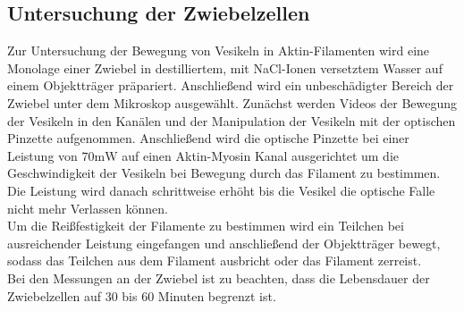 \subsection{Untersuchung der Zwiebelzellen}
Zur Untersuchung der Bewegung von Vesikeln in Aktin-Filamenten wird eine Monolage einer Zwiebel in destilliertem, mit NaCl-Ionen versetztem Wasser auf einem Objektträger präpariert. Anschließend wird ein unbeschädigter Bereich der Zwiebel unter dem Mikroskop ausgewählt. Zunächst werden Videos der Bewegung der Vesikeln in den Kanälen und der Manipulation der Vesikeln mit der optischen Pinzette aufgenommen. Anschließend wird die optische Pinzette bei einer Leistung von $70 \si{\milli\watt}$ auf einen Aktin-Myosin Kanal ausgerichtet um die Geschwindigkeit der Vesikeln bei Bewegung durch das Filament zu bestimmen. Die Leistung wird danach schrittweise erhöht bis die Vesikel die optische Falle nicht mehr Verlassen können.\\
Um die Reißfestigkeit der Filamente zu bestimmen wird ein Teilchen bei ausreichender Leistung eingefangen und anschließend der Objektträger bewegt, sodass das Teilchen aus dem Filament ausbricht oder das Filament zerreist.\\
Bei den Messungen an der Zwiebel ist zu beachten, dass die Lebensdauer der Zwiebelzellen auf 30 bis 60 Minuten begrenzt ist.\\

